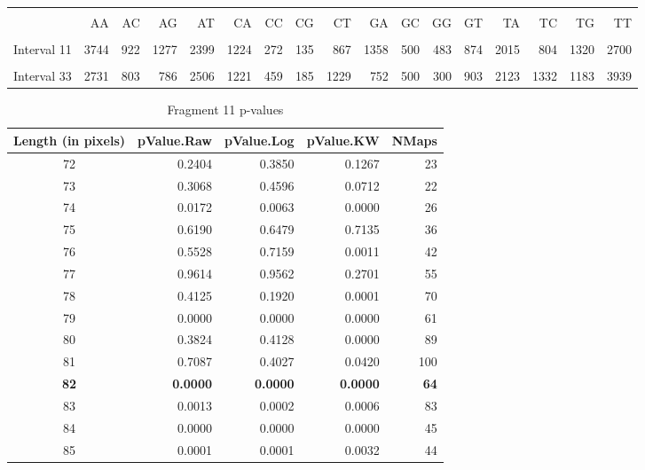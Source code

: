 \documentclass[14pt]{article}
\begin{document}
\begin{table}[ht]
\centering
\begin{tabular}{rrrrrrrrrrrrrrrrr}
  \hline \\
 & AA & AC & AG & AT & CA & CC & CG & CT & GA & GC & GG & GT & TA & TC & TG & TT \\[0.25cm] 
  \hline \hline \\
Interval 11 & 3744 & 922 & 1277 & 2399 & 1224 & 272 & 135 & 867 & 1358 & 500 & 483 & 874 & 2015 & 804 & 1320 & 2700 \\[0.25cm] 
   \hline \\
Interval 33 & 2731 & 803 & 786 & 2506 & 1221 & 459 & 185 & 1229 & 752 & 500 & 300 & 903 & 2123 & 1332 & 1183 & 3939 \\[0.25cm] 
  \hline \hline
\end{tabular}
\end{table}

\begin{table}[H]
\centering
\begin{tabular}{crrrr}
  \hline
Length (in pixels) & pValue.Raw & pValue.Log & pValue.KW & NMaps \\ 
  \hline
72 & 0.2404 & 0.3850 & 0.1267 & 23 \\ 
  73 & 0.3068 & 0.4596 & 0.0712 & 22 \\ 
  74 & 0.0172 & 0.0063 & 0.0000 & 26 \\ 
  75 & 0.6190 & 0.6479 & 0.7135 & 36 \\ 
  76 & 0.5528 & 0.7159 & 0.0011 & 42 \\ 
  77 & 0.9614 & 0.9562 & 0.2701 & 55 \\ 
  78 & 0.4125 & 0.1920 & 0.0001 & 70 \\ 
  79 & 0.0000 & 0.0000 & 0.0000 & 61 \\ 
  80 & 0.3824 & 0.4128 & 0.0000 & 89 \\ 
  81 & 0.7087 & 0.4027 & 0.0420 & 100 \\ 
  {\textbf{82}} & {\textbf{0.0000}} & {\textbf{0.0000}} & {\textbf{0.0000}} & {\textbf{64}} \\ 
  83 & 0.0013 & 0.0002 & 0.0006 & 83 \\ 
  84 & 0.0000 & 0.0000 & 0.0000 & 45 \\ 
  85 & 0.0001 & 0.0001 & 0.0032 & 44 \\ 
   \hline
\end{tabular}
\caption{Fragment 11 p-values} 
\end{table}
\end{document}
